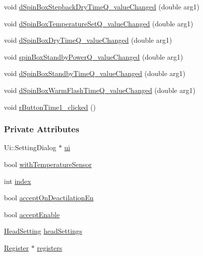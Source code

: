 \begin{DoxyCompactItemize}
\item 
void \mbox{\hyperlink{classSettingDialog_a94dab1fe735e3991220956b64c21219b}{d\+Spin\+Box\+Stepback\+Dry\+Time\+Q\+\_\+value\+Changed}} (double arg1)
\item 
void \mbox{\hyperlink{classSettingDialog_a373951de775a1b220c6d7d9abd59f76c}{d\+Spin\+Box\+Temperature\+Set\+Q\+\_\+value\+Changed}} (double arg1)
\item 
void \mbox{\hyperlink{classSettingDialog_aa6079278861db915fe4a4d18b5008a6e}{d\+Spin\+Box\+Dry\+Time\+Q\+\_\+value\+Changed}} (double arg1)
\item 
void \mbox{\hyperlink{classSettingDialog_a453eecb0650ad29e6d14fb641ef79697}{spin\+Box\+Standby\+Power\+Q\+\_\+value\+Changed}} (double arg1)
\item 
void \mbox{\hyperlink{classSettingDialog_af40ee40d8aff8550e5ffe2ccdac384ae}{d\+Spin\+Box\+Standby\+Time\+Q\+\_\+value\+Changed}} (double arg1)
\item 
void \mbox{\hyperlink{classSettingDialog_af6f257e19ab8d0bc8f724c217c5039af}{d\+Spin\+Box\+Warm\+Flash\+Time\+Q\+\_\+value\+Changed}} (double arg1)
\item 
void \mbox{\hyperlink{classSettingDialog_a0670d5bdf419372d7c5e314b45064a85}{r\+Button\+Time1\+\_\+clicked}} ()
\end{DoxyCompactItemize}
\subsubsection*{Private Attributes}
\begin{DoxyCompactItemize}
\item 
Ui\+::\+Setting\+Dialog $\ast$ \mbox{\hyperlink{classSettingDialog_a445c68adc5c9f920537e4637f9c7e55b}{ui}}
\item 
bool \mbox{\hyperlink{classSettingDialog_a92ac83de20616f1f67f369dec0afe5f0}{with\+Temperature\+Sensor}}
\item 
int \mbox{\hyperlink{classSettingDialog_a293670a08207442bb9ab04a734b70d33}{index}}
\item 
bool \mbox{\hyperlink{classSettingDialog_a76fcfae71a48ee3d0ab4d7a28f850d1a}{accept\+On\+Deactilation\+En}}
\item 
bool \mbox{\hyperlink{classSettingDialog_a5091b6757e8f987f4bdf5de856b694f6}{accept\+Enable}}
\item 
\mbox{\hyperlink{classHeadSetting}{Head\+Setting}} \mbox{\hyperlink{classSettingDialog_ae53d3ff786571f3291668e3d90ad16cb}{head\+Settings}}
\item 
\mbox{\hyperlink{classRegister}{Register}} $\ast$ \mbox{\hyperlink{classSettingDialog_a66c450ef93bc3346d5b2fa08eb58d48f}{registers}}
\end{DoxyCompactItemize}


